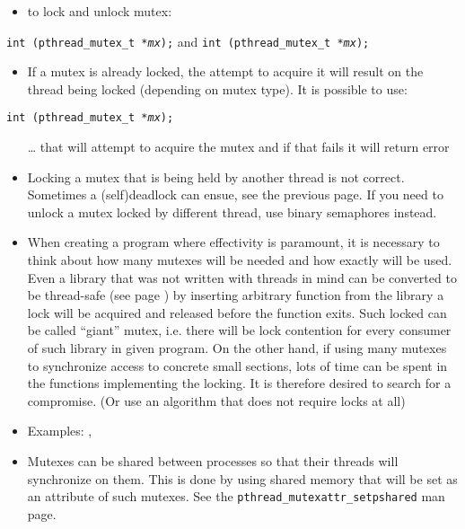 

\begin{slide}

\begin{itemize}
\item to lock and unlock mutex:
\end{itemize}

\texttt{int (pthread\_mutex\_t *\emph{mx});}
\linebreak
and
\linebreak
\texttt{int (pthread\_mutex\_t *\emph{mx});}

\begin{itemize}
\item If a mutex is already locked, the attempt to acquire it will result on the
thread being locked (depending on mutex type).
It is possible to use:
\end{itemize}

\texttt{int (pthread\_mutex\_t *\emph{mx});}

\begin{itemize}
\item[\dots] that will attempt to acquire the mutex and if that fails it will
return error
\end{itemize}
\end{slide}

\label{MUTEXES2}

\begin{itemize}
\item Locking a mutex that is being held by another thread is not correct.
Sometimes a (self)deadlock can ensue, see the previous page. If you need to
unlock a mutex locked by different thread, use binary semaphores instead.
\item When creating a program where effectivity is paramount, it is necessary to
think about how many mutexes will be needed and how exactly will be used.
Even a library that was not written with threads in mind can be converted to be
thread-safe (see page \pageref{THREADSAFE}) by inserting arbitrary function from
the library a lock will be acquired and released before the function exits.
Such locked can be called ``giant'' mutex, i.e. there will be lock contention
for every consumer of such library in given program. On the other hand, if using
many mutexes to synchronize access to concrete small sections, lots of time can
be spent in the functions implementing the locking. It is therefore desired to
search for a compromise. (Or use an algorithm that does not require locks at
all)
\item \label{MUTEX_RACE} Examples: ,
\item Mutexes can be shared between processes so that their threads will
synchronize on them. This is done by using shared memory that will be set as an
attribute of such mutexes. See the
\texttt{pthread\_mutexattr\_setpshared} man page.
\end{itemize}


